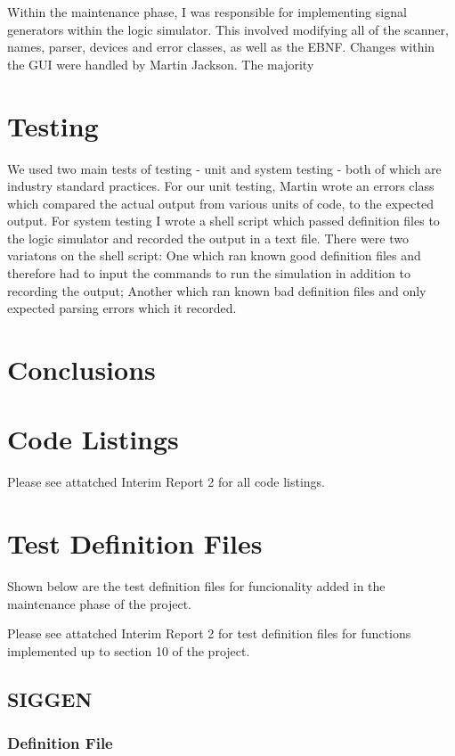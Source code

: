 \documentclass[a4paper,10pt]{article}
\begin{document}
Within the maintenance phase, I was responsible for implementing signal generators within the logic simulator. This involved modifying all of the scanner, names, parser, devices and error classes, as well as the EBNF. Changes within the GUI were handled by Martin Jackson. The majority 

\section{Testing}

We used two main tests of testing - unit and system testing - both of which are industry standard practices. For our unit testing, Martin wrote an errors class which compared the actual output from various units of code, to the expected output. For system testing I wrote a shell script which passed definition files to the logic simulator and recorded the output in a text file. There were two variatons on the shell script: One which ran known good definition files and therefore had to input the commands to run the simulation in addition to recording the output; Another which ran known bad definition files and only expected parsing errors which it recorded.

\section{Conclusions}

\pagebreak

\appendix
\section{Code Listings}
Please see attatched Interim Report 2 for all code listings.

\section{Test Definition Files}

Shown below are the test definition files for funcionality added in the maintenance phase of the project.

Please see attatched Interim Report 2 for test definition files for functions implemented up to section 10 of the project.

\subsection{SIGGEN}

\subsubsection{Definition File}

\end{document}
